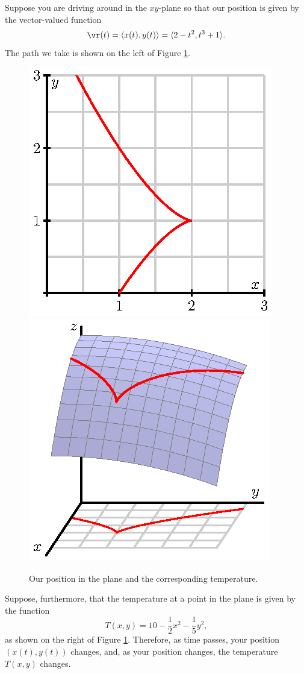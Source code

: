 \begin{pa} \label{PA:10.5} Suppose you are driving around in the
  $xy$-plane so that our position is given by the vector-valued
  function 
  $$
  \vr(t) = \langle x(t), y(t) \rangle = \langle 2-t^2, t^3 + 1\rangle.
  $$
  The path we take is shown on the left of Figure
  \ref{F:10.5.preview}.  

  \begin{figure}
    \begin{center}
      \includegraphics{figures/fig_10_5_preview_r.eps}
      \hspace*{20pt}
      \includegraphics{figures/fig_10_5_preview_h.eps}
    \end{center}
    \caption{Our position in the plane and the corresponding temperature.}
    \label{F:10.5.preview}
  \end{figure}
  Suppose, furthermore, that
  the temperature at a point in the plane is given by
  the function
  $$
  T(x,y) = 10 - \frac12x^2 -\frac15y^2,
  $$
  as shown on the right of Figure \ref{F:10.5.preview}.  Therefore, as
  time passes, your position $(x(t), y(t))$ changes, and, as your position
  changes, the temperature $T(x,y)$ changes.
  

\end{pa}
